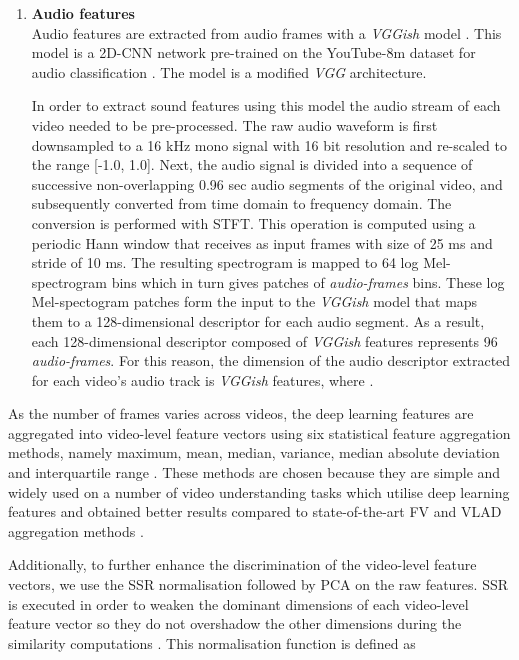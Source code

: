 \documentclass[review]{elsarticle}
\begin{document}
\begin{enumerate}[label = \Alph*.]
\item \textbf{Audio features\\}
Audio features are extracted from audio frames with a \textit{VGGish} model \citep{hershey2017cnn}. This model is a 2D-\ac{CNN} network pre-trained on the YouTube-8m dataset for audio classification \citep{hershey2017cnn}. The model is a modified \textit{VGG} architecture. 

In order to extract sound features using this model the audio stream of each video needed to be pre-processed. The raw audio waveform is first downsampled to a 16 kHz mono signal with 16 bit resolution and re-scaled to the range [-1.0, 1.0]. Next, the audio signal is divided into a sequence of successive non-overlapping 0.96 sec audio segments of the original video, and subsequently converted from time domain to frequency domain. The conversion is performed with \ac{STFT}. This operation is computed using a periodic Hann window that receives as input frames with size of 25 ms and stride of 10 ms. The resulting spectrogram is mapped to 64 log Mel-spectrogram bins which in turn gives patches of  \textit{audio-frames} bins. These log Mel-spectogram patches form the input to the \textit{VGGish} model that maps them to a 128-dimensional descriptor for each audio segment. As a result, each 128-dimensional descriptor composed of \textit{VGGish} features represents 96 \textit{audio-frames}. For this reason, the dimension of the audio descriptor extracted for each video's audio track is  \textit{VGGish} features, where .

\end{enumerate}


As the number of frames varies across videos, the deep learning features are aggregated into video-level feature vectors using six statistical feature aggregation methods, namely maximum, mean, median, variance, median absolute deviation and interquartile range \citep{almeida2020visual}. These methods are chosen because they are simple and widely used on a number of video understanding tasks which utilise deep learning features \citep{liu2019use, miech2019howto100m, almeida2020visual} and obtained better results compared to state-of-the-art \ac{FV} and \ac{VLAD} aggregation methods \citep{abu2016youtube,deldjoo2019movie}. 

Additionally, to further enhance the discrimination of the video-level feature vectors, we use the \ac{SSR} normalisation followed by \ac{PCA} on the raw features. \ac{SSR} is executed in order to weaken the dominant dimensions of each video-level feature vector so they do not overshadow the other dimensions during the similarity computations \citep{du2018personalized}. This normalisation function is defined as 
\end{document}
